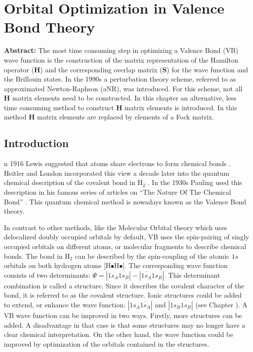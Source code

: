 \chapter{Orbital Optimization in Valence Bond Theory}
\label{chap_orbopt}


\noindent\textbf{Abstract:} The most time consuming step in optimizing a Valence Bond (VB) wave function is the construction of the matrix representation of the Hamilton operator ($\mathbf{H}$) and the corresponding overlap matrix ($\mathbf{S}$) for the wave function and the Brillouin states. In the 1990s a perturbation theory scheme, referred to as approximated Newton-Raphson (aNR), was introduced. For this scheme, not all $\mathbf{H}$ matrix elements need to be constructed. In this chapter an alternative, less time consuming method  to construct $\mathbf{H}$ matrix elements is introduced. In this method $\mathbf{H}$ matrix elements are replaced by elements of a Fock matrix.

\newpage

\section{Introduction}

\lettrine{}{}n 1916 Lewis suggested that atoms share electrons to form chemical bonds \cite{lewis}. Heitler and London incorporated this view a decade later into the quantum chemical description of the covalent bond in H$_2$ \cite{heitler}. In the 1930s Pauling used this description in his famous series of articles on ``The Nature Of The Chemical Bond'' \cite{pauling1,pauling2,pauling3,pauling4,pauling5,pauling6,pauling7,paulingbook}. This quantum chemical method is nowadays known as the Valence Bond theory.

In contrast to other methods, like the Molecular Orbital theory \cite{hartree1,hartree2,hartree3,fock} which uses delocalized doubly occupied orbitals by default, 
VB uses the spin-pairing of singly occupied orbitals on different atoms, or molecular fragments to describe chemical bonds. The bond in H$_2$ can be described by the spin-coupling of the atomic $1s$ orbitals on both hydrogen atoms [H$\bullet$H$\bullet$]. The corresponding wave function consists of two determinants: $\Psi = |1s_{A}\overline{1s_{B}}| - |\overline{1s_{A}}1s_{B}|$. This determinant combination is called a structure. Since it describes the covalent character of the bond, it is referred to as the covalent structure. Ionic structures could be added to extend, or enhance the wave function: $|1s_{A}\overline{1s_{A}}|$ and $|1s_{B}\overline{1s_{B}}|$ (see Chapter \chintro). A VB wave function can be improved in two ways. Firstly, more structures can be added. A disadvantage in that case is that some structures may no longer have a clear chemical interpretation. On the other hand, the wave function could be improved by optimization of the orbitals contained in the structures.

